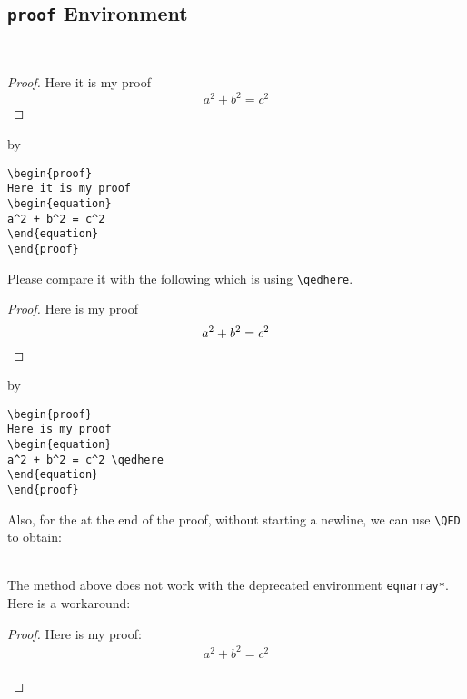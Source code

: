 \subsection{\texttt{\Large proof} Environment}
%
\par \raggedright{}\\
%
\begin{proof}
Here it is my proof	
	\begin{equation}
	a^2 + b^2 = c^2
	\end{equation}
\end{proof}
%
by
%
\begin{verbatim}
\begin{proof}
Here it is my proof	
\begin{equation}
a^2 + b^2 = c^2
\end{equation}
\end{proof}
\end{verbatim}
%
%
Please compare it with the following which is using \verb!\qedhere!.
%
\begin{proof}
	Here is my proof
	\begin{equation}
		a^2 + b^2 = c^2 \qedhere
	\end{equation}
\end{proof}
%
by
%
\begin{verbatim}
\begin{proof}
Here is my proof
\begin{equation}
a^2 + b^2 = c^2 \qedhere
\end{equation}
\end{proof}
\end{verbatim}
%
%
Also, for the  at the end of the proof, without starting a newline, we can use \verb!\QED! to obtain: \QED
%
%
\par \raggedright{}\\
The method above does not work with the deprecated environment \texttt{eqnarray*}. Here is a workaround:
%
%
\begin{proof}
Here is my proof:
\begin{eqnarray*}
a^2 + b^2 = c^2
\end{eqnarray*}
\vspace{-1.3cm}\[\qedhere\]
\end{proof}
